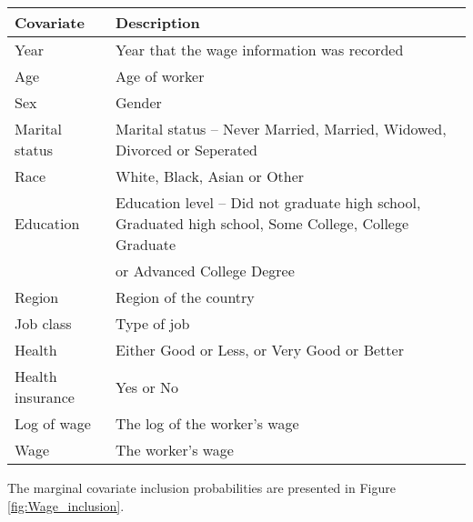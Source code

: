 \documentclass{amsart}[12pt]
\begin{document}
\begin{tabular}{|ll|}
	\hline
	Covariate        & Description                                                                           \\
	\hline
	Year             & Year that the wage information was recorded                                           \\
	Age              & Age of worker                                                                         \\
	Sex              & Gender                                                                                \\
	Marital status   & Marital status -- Never Married, Married, Widowed, Divorced or Seperated              \\
	Race             & White, Black, Asian or Other                                                          \\
	Education        & Education level -- Did not graduate high school, Graduated high school, Some College, 
	College Graduate \\
	                 & or Advanced College Degree                                                            \\
	Region           & Region of the country                                                                 \\
	Job class        & Type of job                                                                           \\
	Health           & Either Good or Less, or Very Good or Better                                           \\
	Health insurance & Yes or No                                                                             \\
	Log of wage      & The log of the worker's wage                                                          \\
	Wage             & The worker's wage                                                                     \\
	\hline
\end{tabular}

The marginal covariate inclusion probabilities are presented in Figure \ref{fig:Wage_inclusion}.

\end{document}
